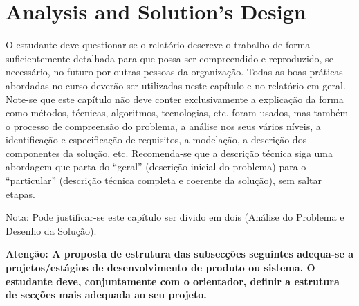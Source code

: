 \chapter{Analysis and Solution's Design} %
\label{chap:analysis-design}

O estudante deve questionar se o relatório descreve o trabalho de forma suficientemente detalhada para que possa ser compreendido e reproduzido, se necessário, no futuro por outras pessoas da organização. Todas as boas práticas abordadas no curso deverão ser utilizadas neste capítulo e no relatório em geral. Note-se que este capítulo não deve conter exclusivamente a explicação da forma como métodos, técnicas, algoritmos, tecnologias, etc. foram usados, mas também o processo de compreensão do problema, a análise nos seus vários níveis, a identificação e especificação de requisitos, a modelação, a descrição dos componentes da solução, etc. Recomenda-se que a descrição técnica siga uma abordagem que parta do “geral” (descrição inicial do problema) para o “particular” (descrição técnica completa e coerente da solução), sem saltar etapas.

Nota: Pode justificar-se este capítulo ser divido em dois (Análise do Problema e Desenho da Solução).


\textbf{Atenção: A proposta de estrutura das subsecções seguintes adequa-se a projetos/estágios de desenvolvimento de produto ou sistema. O estudante deve, conjuntamente com o orientador, definir a estrutura de secções mais adequada ao seu projeto.}







